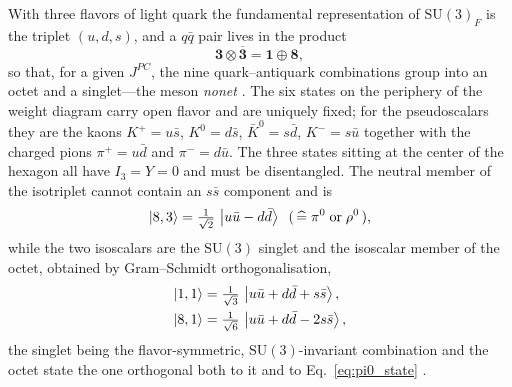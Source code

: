 With three flavors of light quark the fundamental representation of
$\mathrm{SU(3)}_{F}$ is the triplet $(u,d,s)$, and a $q\bar q$ pair lives in the product
\begin{equation}
    \mathbf{3}\otimes\overline{\mathbf{3}} = \mathbf{1}\oplus\mathbf{8},
    \label{eq:nonet_decomp}
\end{equation}
so that, for a given $J^{PC}$, the nine quark--antiquark combinations group into an
octet and a singlet---the meson \emph{nonet} \cite[Ch.~7]{Amsler2018}. The six
states on the periphery of the weight diagram carry open flavor and are uniquely
fixed; for the pseudoscalars they are the kaons $K^+ = u\bar s$, $K^0 = d\bar s$,
$\bar K^0 = s\bar d$, $K^- = s\bar u$ together with the charged pions
$\pi^+ = u\bar d$ and $\pi^- = d\bar u$. The three states sitting at the center of
the hexagon all have $I_{3} = Y = 0$ and must be disentangled. The neutral member of
the isotriplet cannot contain an $s\bar s$ component and is
\begin{equation}
    \ket{8,3} = \tfrac{1}{\sqrt 2}\,\ket{u\bar u - d\bar d}
    \;\;(\,\widehat{=}\;\pi^0\;\text{or}\;\rho^0\,),
    \label{eq:pi0_state}
\end{equation}
while the two isoscalars are the $\mathrm{SU}(3)$ singlet and the isoscalar member of
the octet, obtained by Gram--Schmidt orthogonalisation,
\begin{align}
    \ket{1,1} &= \tfrac{1}{\sqrt 3}\,\ket{u\bar u + d\bar d + s\bar s}, \\
    \ket{8,1} &= \tfrac{1}{\sqrt 6}\,\ket{u\bar u + d\bar d - 2s\bar s},
    \label{eq:singlet_octet}
\end{align}
the singlet being the flavor-symmetric, $\mathrm{SU}(3)$-invariant combination and
the octet state the one orthogonal both to it and to Eq.~\eqref{eq:pi0_state}
\cite[Ch.~7]{Amsler2018}.


